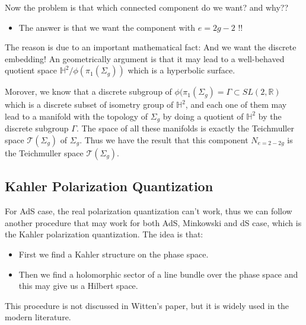 Now the problem is that which connected component do we want? and why??
\begin{itemize}
  \item The answer is that we want the component with $ e = 2g-2 $ !!
\end{itemize}
The reason is due to an important mathematical fact:
And we want the discrete embedding! An geometrically argument is that
it may lead to a well-behaved quotient space $ \mathbb{H}^2 /
\phi(\pi_1(\Sigma_g)) $ which is a hyperbolic surface.


Morover, we know that a discrete subgroup of $ \phi(\pi_1(\Sigma_g) = \Gamma
  \subset SL(2,\mathbb{R}) $
  which is a discrete subset of isometry group of $ \mathbb{H}^2 $,
  and each one of them may lead to a manifold with the topology of $
  \Sigma_g $ by doing a quotient of $ \mathbb{H}^2 $ by the discrete
  subgroup $ \Gamma $. The space of all these manifolds is exactly the
  Teichmuller space $ \mathcal{T}(\Sigma_g) $ of $ \Sigma_g $. Thus
  we have the result that this component $ N_{e=2-2g} $ is the
  Teichmuller space $ \mathcal{T}(\Sigma_g) $.

  \subsection{Kahler Polarization Quantization}
  For AdS case, the real polarization quantization can't work, thus we
  can follow another procedure that may work for both AdS, Minkowski
  and dS case, which is the Kahler polarization quantization.
  The idea is that:
  \begin{itemize}
    \item First we find a Kahler structure on the phase space.
    \item Then we find a holomorphic sector of a line bundle over the
      phase space and this may give us a Hilbert space.
  \end{itemize}
  This procedure is not discussed in Witten's paper, but it is widely
  used in the modern literature.
